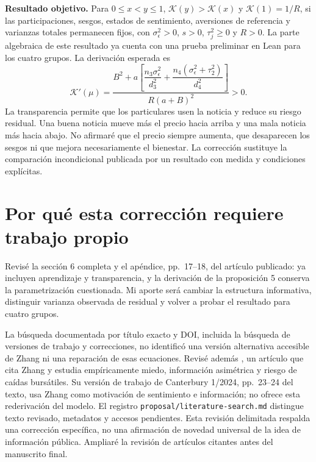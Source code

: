 \documentclass[11pt]{article}
\begin{document}
\textbf{Resultado objetivo.} Para $0\leq x<y\leq1$,
$\mathcal K(y)>\mathcal K(x)$ y $\mathcal K(1)=1/R$, si las participaciones,
sesgos, estados de sentimiento, aversiones de referencia y varianzas totales
permanecen fijos, con $\sigma_\epsilon^2>0$, $s>0$, $\tau_j^2\geq0$ y
$R>0$. La parte algebraica de este resultado ya cuenta con una prueba
preliminar en Lean para los cuatro grupos. La derivación esperada es
\begin{equation}\label{eq:derivative}
 \mathcal K'(\mu)=
 \frac{B^2+a\left[\dfrac{n_3\sigma_\epsilon^2}{d_3^2}
                 +\dfrac{n_4(\sigma_\epsilon^2+\tau_2^2)}{d_4^2}\right]}
      {R(a+B)^2}>0.
\end{equation}
La transparencia permite que los particulares usen la noticia y reduce su
riesgo residual. Una buena noticia mueve más el precio hacia arriba y una
mala noticia más hacia abajo. No afirmaré que el precio siempre aumenta,
que desaparecen los sesgos ni que mejora necesariamente el bienestar.
La corrección sustituye la comparación incondicional publicada por un
resultado con medida y condiciones explícitas.

\newpage
\section{Por qué esta corrección requiere trabajo propio}
Revisé la sección 6 completa y el apéndice, pp.~17--18, del artículo
publicado: ya incluyen aprendizaje y transparencia, y la derivación de
la proposición 5 conserva la parametrización cuestionada. Mi aporte será
cambiar la estructura informativa, distinguir varianza observada de residual
y volver a probar el resultado para cuatro grupos.

La búsqueda documentada por título exacto y DOI, incluida la búsqueda de
versiones de trabajo y correcciones, no identificó una versión alternativa
accesible de Zhang ni una reparación de esas ecuaciones. Revisé además
\citet{das2024}, un artículo que cita Zhang y estudia empíricamente miedo,
información asimétrica y riesgo de caídas bursátiles. Su versión de trabajo
de Canterbury 1/2024, pp.~23--24 del texto, usa Zhang como motivación de
sentimiento e información; no ofrece esta rederivación del modelo.
El registro \texttt{proposal/literature-search.md} distingue texto revisado,
metadatos y accesos pendientes. Esta revisión delimitada respalda una
corrección específica, no una afirmación de novedad universal de la idea
de información pública. Ampliaré la revisión de artículos citantes antes
del manuscrito final.
\end{document}
